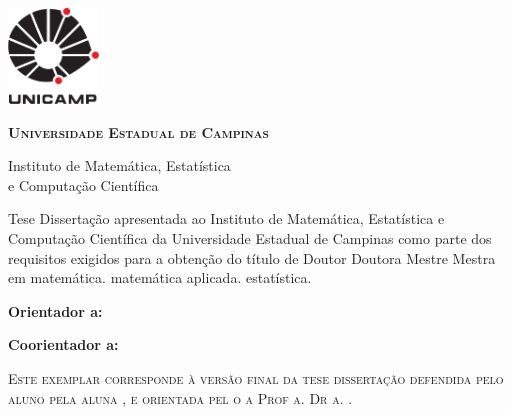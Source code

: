 \thispagestyle{plain}
\includegraphics[width=.94in, height=1in,
keepaspectratio=true]{figuras/unicamp-logo}
\begin{center}
  {\large\textbf{\textsc{Universidade Estadual de Campinas}}
  \vspace{.5cm}

  Instituto de Matemática, Estatística \\
  e Computação Científica}
\end{center}
\vfill
\begin{center}
  {\large\textbf{\textsc{\autor}}}
\end{center}
\vfill
\begin{center}
  {\Large\textbf{\textsc{\titulo}}}
\end{center}
\vfill

\begin{flushright}
  \begin{minipage}[c]{.5\textwidth}
    \ifx\mestrado\undefined
    Tese
    \else
    Dissertação
    \fi
    apresentada ao Instituto de Matemática,
    Estatística e Computação Científica da Universidade
    Estadual de Campinas como parte dos requisitos exigidos
    para a obtenção do título de
    \ifx\mestrado\undefined
    \ifx\femaleAuthor\undefined
    Doutor
    \else
    Doutora
    \fi
    \else
    \ifx\femaleAuthor\undefined
    Mestre
    \else
    Mestra
    \fi
    \fi
    em
    \ifx\matematica\undefined
    \else
    matemática.
    \fi
    \ifx\aplicada\undefined
    \else
    matemática aplicada.
    \fi
    \ifx\estatistica\undefined
    \else
    estatística.
    \fi
  \end{minipage}
\end{flushright}
\vspace{.5cm}

\noindent
\textbf{Orientador\ifx\femaleOrientador\undefined
\else
a\fi: \orientador
}
\vspace{.25cm}

\ifx\coorientador\undefined
\else
\noindent
\textbf{Coorientador\ifx\femaleCoorientador\undefined
\else
a\fi: \coorientador
}
\vspace{.5cm}
\fi

\noindent
\begin{minipage}[c]{.5\textwidth}
  {\footnotesize\textsc{Este exemplar corresponde à versão final da
  \ifx\mestrado\undefined
  tese
  \else
  dissertação
  \fi
  defendida
  \ifx\femaleAuthor\undefined
  pelo aluno
  \else
  pela aluna
  \fi
  \autor,
  e orientada pel\ifx\femaleOrientador\undefined
  o\else
  a\fi{} Prof\ifx\femaleOrientador\undefined
  \else
  a\fi. Dr\ifx\femaleOrientador\undefined
  \else
  a\fi. \orientador.
  }}
\end{minipage}
\vspace{1cm}

